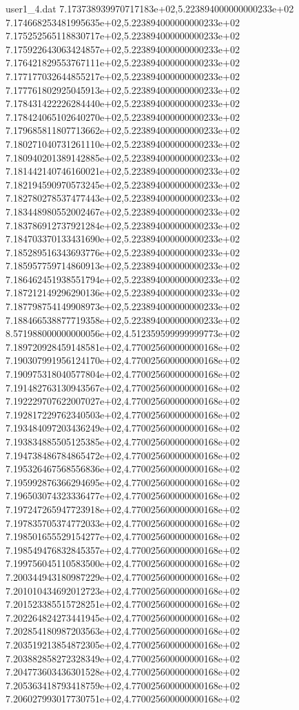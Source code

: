 \begin{filecontents}{user1_4.dat}
7.173738939970717183e+02,5.223894000000000233e+02
7.174668253481995635e+02,5.223894000000000233e+02
7.175252565118830717e+02,5.223894000000000233e+02
7.175922643063424857e+02,5.223894000000000233e+02
7.176421829553767111e+02,5.223894000000000233e+02
7.177177032644855217e+02,5.223894000000000233e+02
7.177761802925045913e+02,5.223894000000000233e+02
7.178431422226284440e+02,5.223894000000000233e+02
7.178424065102640270e+02,5.223894000000000233e+02
7.179685811807713662e+02,5.223894000000000233e+02
7.180271040731261110e+02,5.223894000000000233e+02
7.180940201389142885e+02,5.223894000000000233e+02
7.181442140746160021e+02,5.223894000000000233e+02
7.182194590970573245e+02,5.223894000000000233e+02
7.182780278537477443e+02,5.223894000000000233e+02
7.183448980552002467e+02,5.223894000000000233e+02
7.183786912737921284e+02,5.223894000000000233e+02
7.184703370133431690e+02,5.223894000000000233e+02
7.185289516343693776e+02,5.223894000000000233e+02
7.185957759714860913e+02,5.223894000000000233e+02
7.186462451938551794e+02,5.223894000000000233e+02
7.187212149296290136e+02,5.223894000000000233e+02
7.187798754149908973e+02,5.223894000000000233e+02
7.188466538877719358e+02,5.223894000000000233e+02
8.571988000000000056e+02,4.512359599999999773e+02
7.189720928459148581e+02,4.770025600000000168e+02
7.190307991956124170e+02,4.770025600000000168e+02
7.190975318040577804e+02,4.770025600000000168e+02
7.191482763130943567e+02,4.770025600000000168e+02
7.192229707622007027e+02,4.770025600000000168e+02
7.192817229762340503e+02,4.770025600000000168e+02
7.193484097203436249e+02,4.770025600000000168e+02
7.193834885505125385e+02,4.770025600000000168e+02
7.194738486784865472e+02,4.770025600000000168e+02
7.195326467568556836e+02,4.770025600000000168e+02
7.195992876366294695e+02,4.770025600000000168e+02
7.196503074323336477e+02,4.770025600000000168e+02
7.197247265947723918e+02,4.770025600000000168e+02
7.197835705374772033e+02,4.770025600000000168e+02
7.198501655529154277e+02,4.770025600000000168e+02
7.198549476832845357e+02,4.770025600000000168e+02
7.199756045110583500e+02,4.770025600000000168e+02
7.200344943180987229e+02,4.770025600000000168e+02
7.201010434692012723e+02,4.770025600000000168e+02
7.201523385515728251e+02,4.770025600000000168e+02
7.202264824273441945e+02,4.770025600000000168e+02
7.202854180987203563e+02,4.770025600000000168e+02
7.203519213854872305e+02,4.770025600000000168e+02
7.203882858272328349e+02,4.770025600000000168e+02
7.204773603436301528e+02,4.770025600000000168e+02
7.205363418793418759e+02,4.770025600000000168e+02
7.206027993017730751e+02,4.770025600000000168e+02

\end{filecontents}
